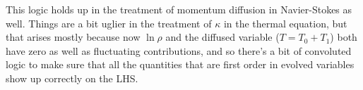 \documentclass[letterpaper,12pt]{paper}
\begin{document}
This logic holds up in the treatment of momentum diffusion in Navier-Stokes as well.  Things are a bit uglier in the treatment of $\kappa$ in the thermal equation, but that arises mostly because now $\ln \rho$ and the diffused variable ($T=T_0+T_1$) both have zero as well as fluctuating contributions, and so there's a bit of convoluted logic to make sure that all the quantities that are first order in evolved variables show up correctly  on the LHS. 
\end{document}
